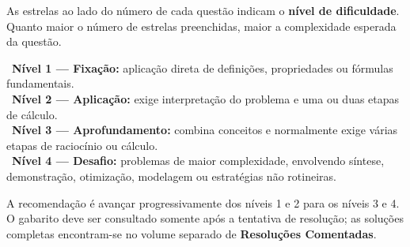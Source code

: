 \documentclass[11pt,a4paper,oneside]{article}
\begin{document}
\begin{conceito}
As estrelas ao lado do número de cada questão indicam o \textbf{nível de dificuldade}. Quanto maior o número de estrelas preenchidas, maior a complexidade esperada da questão.

\legendaniveis

\noindent
{}~\textbf{Nível 1 --- Fixação:} aplicação direta de definições, propriedades ou fórmulas fundamentais.\\[1mm]
~\textbf{Nível 2 --- Aplicação:} exige interpretação do problema e uma ou duas etapas de cálculo.\\[1mm]
~\textbf{Nível 3 --- Aprofundamento:} combina conceitos e normalmente exige várias etapas de raciocínio ou cálculo.\\[1mm]
~\textbf{Nível 4 --- Desafio:} problemas de maior complexidade, envolvendo síntese, demonstração, otimização, modelagem ou estratégias não rotineiras.
\end{conceito}

A recomendação é avançar progressivamente dos níveis 1 e 2 para os níveis 3 e 4. O gabarito deve ser consultado somente após a tentativa de resolução; as soluções completas encontram-se no volume separado de \textbf{Resoluções Comentadas}.

\newpage
\renewcommand{\contentsname}{\sffamily\color{azulprof}Sumário}
\tableofcontents
\newpage


\end{document}

